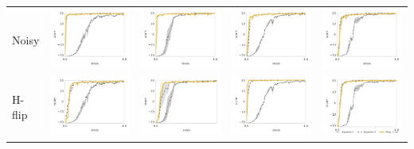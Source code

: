 \begin{table}
\begin{tabular}{m{} >{\centering}m{} >{\centering}m{} >{\centering}m{} >{\centering\arraybackslash}m{} }
	Noisy &
	\includegraphics[width=.22\textwidth]{figures/app_plots/pongs/pong_noise/pong} &
        \includegraphics[width=.22\textwidth]{figures/app_plots/pongs/pong_noise/pong_black} &
        \includegraphics[width=.22\textwidth]{figures/app_plots/pongs/pong_noise/pong_h_flip} &
        \includegraphics[width=.22\textwidth]{figures/app_plots/pongs/pong_noise/pong_hv_flip} \\

	H-flip &
	\includegraphics[width=.22\textwidth]{figures/app_plots/pongs/pong_h_flip/pong} &
        \includegraphics[width=.22\textwidth]{figures/app_plots/pongs/pong_h_flip/pong_black} &
        \includegraphics[width=.22\textwidth]{figures/app_plots/pongs/pong_h_flip/pong_h_flip} &
        \includegraphics[width=.22\textwidth]{figures/app_plots/pongs_legend/pong_h_flip/pong_hv_flip} \\
    \end{tabular}
\end{table}
